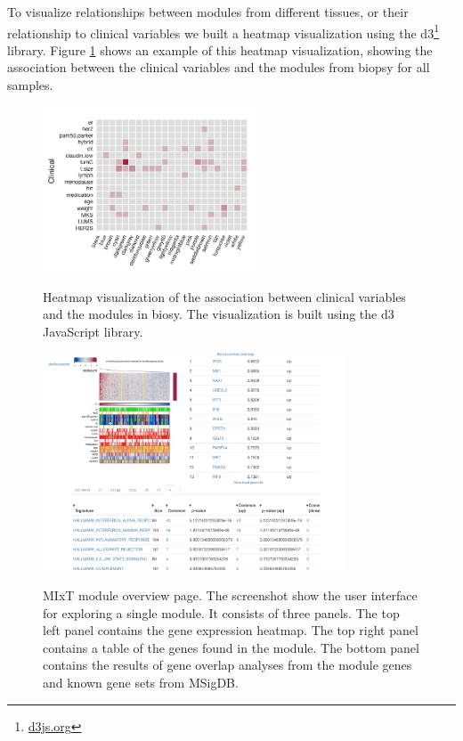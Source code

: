 To visualize relationships between modules from different tissues, or their
relationship to clinical variables we built a heatmap visualization using the 
d3\footnote{\url{d3js.org}} library. Figure \ref{fig_second_case} shows an
example of this heatmap visualization, showing the association between the
clinical variables and the modules from biopsy for all samples.  

\begin{figure}[h!]
\centering
\caption{Heatmap visualization of the association between clinical variables and
the modules in biosy. The visualization is built using the d3 JavaScript
library.} 
\includegraphics[width=2.5in]{figures/clinical-comp.png}
\label{fig_second_case}
\end{figure} 


\begin{figure}[h!]
\centering
\caption{MIxT module overview page. The screenshot show the user interface for
exploring a single module. It consists of three panels. The top left panel
contains the gene expression heatmap. The top right panel contains a table of
the genes found in the module. The bottom panel contains the results of gene
overlap analyses from the module genes and known gene sets from MSigDB.}
\includegraphics[width=0.8\textwidth]{figures/module.png}
\label{fig_first_case}
\end{figure} 


